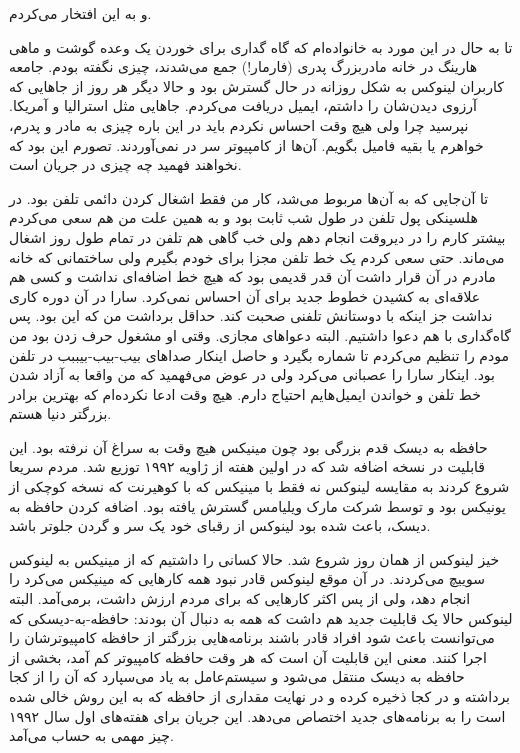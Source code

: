 و به این افتخار می‌کردم. 

تا به حال در این مورد به خانواده‌ام که گاه گداری برای خوردن یک وعده
گوشت و ماهی هارینگ در خانه مادربزرگ پدری (فارمار!) جمع می‌شدند،‌ چیزی
نگفته بودم. جامعه کاربران لینوکس به شکل روزانه در حال گسترش بود و حالا
دیگر هر روز از جاهایی که آرزوی دیدن‌شان را داشتم، ایمیل دریافت
می‌کردم. جاهایی مثل استرالیا و آمریکا. نپرسید چرا ولی هیچ وقت احساس
نکردم باید در این باره چیزی به مادر و پدرم، خواهرم یا بقیه فامیل
بگویم. آن‌ها از کامپیوتر سر در نمی‌آوردند. تصورم این بود که نخواهند
فهمید چه چیزی در جریان است.

تا آن‌جایی که به آن‌ها مربوط می‌شد،‌ کار من فقط اشغال کردن دائمی تلفن
بود. در هلسینکی پول تلفن در طول شب ثابت بود و به همین علت من هم سعی
می‌کردم بیشتر کارم را در دیروقت انجام دهم ولی خب گاهی هم تلفن در تمام
طول روز اشغال می‌ماند. حتی سعی کردم یک خط تلفن مجزا برای خودم بگیرم ولی
ساختمانی که خانه مادرم در آن قرار داشت آن قدر قدیمی بود که هیچ خط
اضافه‌ای نداشت و کسی هم علاقه‌ای به کشیدن خطوط جدید برای آن احساس
نمی‌کرد. سارا در آن دوره کاری نداشت جز اینکه با دوستانش تلفنی صحبت
کند. حداقل برداشت من که این بود. پس گاه‌گداری با هم دعوا داشتیم. البته
دعواهای مجازی. وقتی او مشغول حرف زدن بود من مودم را تنظیم می‌کردم تا
شماره بگیرد و حاصل اینکار صداهای بیب-بیب-بیببب در تلفن بود. اینکار
سارا را عصبانی می‌کرد ولی در عوض می‌فهمید که من واقعا به آزاد شدن خط
تلفن و خواندن ایمیل‌هایم احتیاج دارم. هیچ وقت ادعا نکرده‌ام که بهترین
برادر بزرگتر دنیا هستم.

حافظه به دیسک قدم بزرگی بود چون مینیکس هیچ وقت به سراغ آن نرفته
بود. این قابلیت در نسخه  اضافه شد که در اولین هفته از ژاویه
۱۹۹۲ توزیع شد. مردم سریعا شروع کردند به مقایسه لینوکس نه فقط با مینیکس
که با کوهیرنت که نسخه کوچکی از یونیکس بود و توسط
شرکت مارک ویلیامس گسترش یافته
بود. اضافه کردن حافظه به دیسک، باعث شده بود لینوکس از رقبای خود یک سر
و گردن جلوتر باشد.

خیز لینوکس از همان روز شروع شد. حالا کسانی را داشتیم که از مینیکس به
لینوکس سوییچ می‌کردند. در آن موقع لینوکس قادر نبود همه کارهایی که
مینیکس می‌کرد را انجام دهد، ولی از پس اکثر کارهایی که برای مردم ارزش
داشت، برمی‌آمد. البته لینوکس حالا یک قابلیت جدید هم داشت که همه به
دنبال آن بودند: حافظه-به-دیسکی که می‌توانست باعث شود افراد قادر باشند
برنامه‌هایی بزرگتر از حافظه کامپیوترشان را اجرا کنند. معنی این قابلیت
آن است که هر وقت حافظه کامپیوتر کم آمد،‌ بخشی از حافظه به دیسک منتقل
می‌شود و سیستم‌عامل به یاد می‌سپارد که آن را از کجا برداشته و در کجا
ذخیره کرده و در نهایت مقداری از حافظه که به این روش خالی شده است را به
برنامه‌های جدید اختصاص می‌دهد. این جریان برای هفته‌های اول سال ۱۹۹۲ چیز
مهمی به حساب می‌‌آمد.

